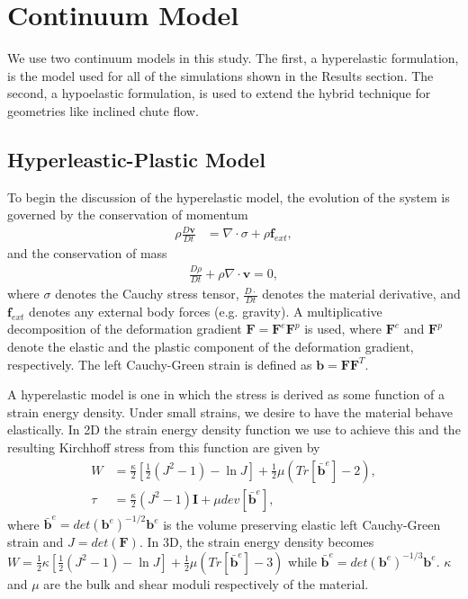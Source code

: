 \chapter{Continuum Model}
We use two continuum models in this study. The first, a hyperelastic formulation, is the model used for all of the simulations shown in the Results section. The second, a hypoelastic formulation, is used to extend the hybrid technique for geometries like inclined chute flow.

\section{Hyperleastic-Plastic Model} \label{hyperelastic_model}
To begin the discussion of the hyperelastic model, the evolution of the system is governed by the conservation of momentum
\begin{align}
\rho \frac{D \bm{v}}{D t} &= \nabla \cdot \sigma + \rho \bm{f}_{ext} ,
\end{align}
and the conservation of mass
\begin{align}
\frac{D \rho}{D t} + \rho \nabla \cdot \bm{v} = 0 ,
\end{align}
where $\sigma$ denotes the Cauchy stress tensor, $\frac{D \cdot}{D t}$ denotes the material derivative, and $\bm{f}_{ext}$ denotes any external body forces (e.g. gravity). A multiplicative decomposition of the deformation gradient $\boldsymbol{F} = \boldsymbol{F}^e \boldsymbol{F}^p$ is used, where $\boldsymbol{F}^e$ and $\boldsymbol{F}^p$ denote the elastic and the plastic component of the deformation gradient, respectively. The left Cauchy-Green strain is defined as $\boldsymbol{b} = \boldsymbol{F} \boldsymbol{F}^T$.

A hyperelastic model is one in which the stress is derived as some function of a strain energy density.
Under small strains, we desire to have the material behave elastically. In 2D the strain energy density function we use to achieve this and the resulting Kirchhoff stress from this function are given by
\begin{align}
W &= \frac{\kappa}{2} \left[ \frac{1}{2} ( J^2 - 1 ) - \ln J \right] + \frac{1}{2} \mu ( Tr[ \bar{\bm{b}}^e ] - 2 ) , \\
\tau &= \frac{\kappa}{2} \left( J^2 - 1 \right) \bm{I} + \mu dev[\bar{\bm{b}}^e] ,
\end{align}
where $\bar{\bm{b}}^e = det\left( \bm{b}^e \right)^{-1/2} \bm{b}^e$ is the volume preserving elastic left Cauchy-Green strain and $J = det\left( \bm{F} \right)$. In 3D, the strain energy density becomes $W = \frac{1}{2} \kappa \left[ \frac{1}{2} ( J^2 - 1 ) - \ln J \right] + \frac{1}{2} \mu ( Tr[ \bar{\bm{b}}^e ] - 3 )$ while $\bar{\bm{b}}^e = det\left( \bm{b}^e \right)^{-1/3} \bm{b}^e$. $\kappa$ and $\mu$ are the bulk and shear moduli respectively of the material.

